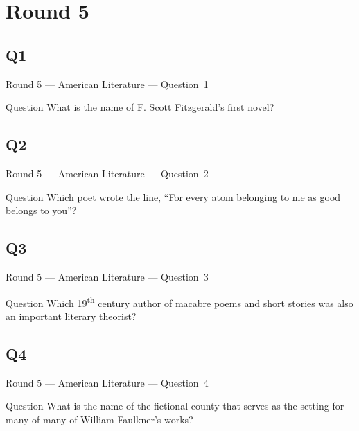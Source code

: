 \documentclass[11pt]{beamer}
\begin{document}
\section{Round 5}
\subsection*{Q1}
\begin{frame}[t]{Round 5 --- American Literature --- \mbox{Question 1}}
\vspace{-0.5em}
\begin{block}{Question}
What is the name of F. Scott Fitzgerald's first novel?
\end{block}
\end{frame}
\subsection*{Q2}
\begin{frame}[t]{Round 5 --- American Literature --- \mbox{Question 2}}
\vspace{-0.5em}
\begin{block}{Question}
Which poet wrote the line, ``For every atom belonging to me as good belongs to you''?
\end{block}
\end{frame}
\subsection*{Q3}
\begin{frame}[t]{Round 5 --- American Literature --- \mbox{Question 3}}
\vspace{-0.5em}
\begin{block}{Question}
Which 19\textsuperscript{th} century author of macabre poems and short stories was also an important literary theorist?
\end{block}
\end{frame}
\subsection*{Q4}
\begin{frame}[t]{Round 5 --- American Literature --- \mbox{Question 4}}
\vspace{-0.5em}
\begin{block}{Question}
What is the name of the fictional county that serves as the setting for many of many of William Faulkner's works?
\end{block}
\end{frame}
\end{document}
